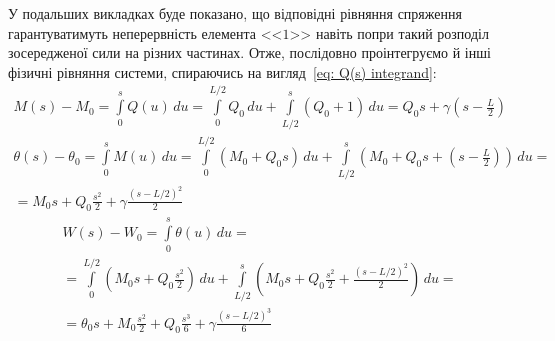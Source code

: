\documentclass{mathreport}
\begin{document}
У подальших викладках буде показано, що відповідні рівняння спряження гарантуватимуть неперервність елемента <<$1$>> навіть попри такий розподіл зосередженої сили на різних частинах. Отже, послідовно проінтегруємо й інші фізичні рівняння системи, спираючись на вигляд~\eqref{eq: Q(s) integrand}:
\begin{multline}\label{eq: M(s) integrand}
    M(s)-M_0 = \int\limits_{0}^{s} Q(u)\, du = \int\limits_{0}^{L/2} Q_0\, du + \int\limits_{L/2}^{s} \left( Q_0 + 1 \right) \, du = Q_0 s + \gamma \left( s-\frac{L}{2} \right)
\end{multline}
\begin{multline}\label{eq: theta(s) integrand}
    \theta(s)-\theta_0 = \int\limits_{0}^{s} M(u)\, du = \int\limits_{0}^{L/2} (M_0 + Q_0s)\, du + \int\limits_{L/2}^{s} \left( M_0 + Q_0s + \left( s-\frac{L}{2} \right) \right)\, du = \\
    = M_0 s + Q_0 \frac{s^2}{2} + \gamma \frac{(s-L/2)^2}{2} 
\end{multline}
\begin{multline}\label{eq: W(s) integrand}
    W(s)-W_0 = \int\limits_{0}^{s} \theta(u)\, du = \\
    = \int\limits_{0}^{L/2} \left( M_0 s + Q_0 \frac{s^2}{2} \right)\, du + \int\limits_{L/2}^{s} \left( M_0 s + Q_0 \frac{s^2}{2} + \frac{(s-L/2)^2}{2} \right)\, du = \\
    = \theta_0 s + M_0 \frac{s^2}{2} + Q_0 \frac{s^3}{6} + \gamma \frac{(s-L/2)^3}{6} 
\end{multline}
\end{document}

